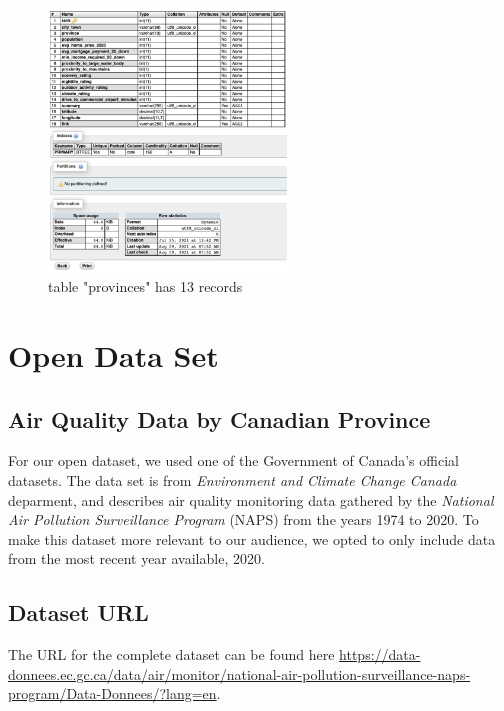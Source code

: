 \documentclass[12pt, letterpaper]{article}
\begin{document}
\begin{figure}[htbp]
	\centering
	\includegraphics[width=2.5in]{images/q20-2.png}
	\caption{table "provinces" has 13 records}
 \end{figure}
 \newpage

\section{Open Data Set}

\subsection*{Air Quality Data by Canadian Province}
For our open dataset, we used one of the Government of Canada's official datasets. The data set is from \textit{Environment and Climate Change Canada} deparment, and describes air quality monitoring data gathered by the \textit{National Air Pollution Surveillance Program} (NAPS) from the years 1974 to 2020. To make this dataset more relevant to our audience, we opted to only include data from the most recent year available, 2020.

\subsection*{Dataset URL}
The URL for the complete dataset can be found here \url{https://data-donnees.ec.gc.ca/data/air/monitor/national-air-pollution-surveillance-naps-program/Data-Donnees/?lang=en}.
\end{document}
